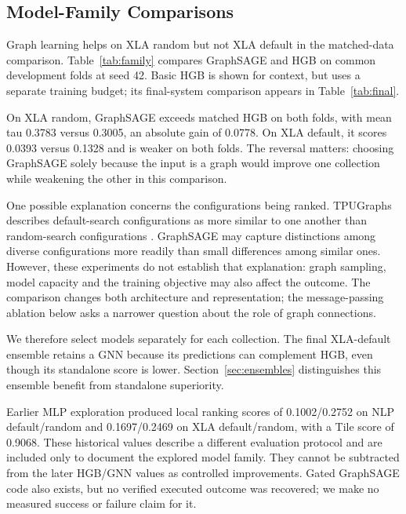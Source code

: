 \documentclass[letterpaper]{article}
\begin{document}
\subsection{Model-Family Comparisons}
\label{sec:family_results}
Graph learning helps on XLA random but not XLA default in the matched-data comparison. Table~\ref{tab:family} compares GraphSAGE and HGB on common development folds at seed 42. Basic HGB is shown for context, but uses a separate training budget; its final-system comparison appears in Table~\ref{tab:final}.

On XLA random, GraphSAGE exceeds matched HGB on both folds, with mean tau 0.3783 versus 0.3005, an absolute gain of 0.0778. On XLA default, it scores 0.0393 versus 0.1328 and is weaker on both folds. The reversal matters: choosing GraphSAGE solely because the input is a graph would improve one collection while weakening the other in this comparison.

One possible explanation concerns the configurations being ranked. TPUGraphs describes default-search configurations as more similar to one another than random-search configurations \citep{tpugraphs}. GraphSAGE may capture distinctions among diverse configurations more readily than small differences among similar ones. However, these experiments do not establish that explanation: graph sampling, model capacity and the training objective may also affect the outcome. The comparison changes both architecture and representation; the message-passing ablation below asks a narrower question about the role of graph connections.

We therefore select models separately for each collection. The final XLA-default ensemble retains a GNN because its predictions can complement HGB, even though its standalone score is lower. Section~\ref{sec:ensembles} distinguishes this ensemble benefit from standalone superiority.

Earlier MLP exploration produced local ranking scores of 0.1002/0.2752 on NLP default/random and 0.1697/0.2469 on XLA default/random, with a Tile score of 0.9068. These historical values describe a different evaluation protocol and are included only to document the explored model family. They cannot be subtracted from the later HGB/GNN values as controlled improvements. Gated GraphSAGE code also exists, but no verified executed outcome was recovered; we make no measured success or failure claim for it.
\end{document}
